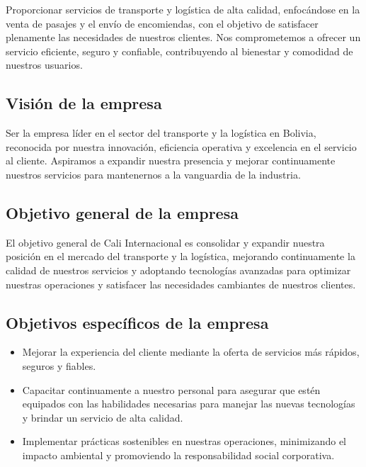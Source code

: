 	Proporcionar servicios de transporte y logística de alta calidad, enfocándose en la venta de pasajes y el envío de encomiendas, con el objetivo de satisfacer plenamente las necesidades de nuestros clientes. Nos comprometemos a ofrecer un servicio eficiente, seguro y confiable, contribuyendo al bienestar y comodidad de nuestros usuarios.
	
	\subsection*{Visión de la empresa}
	
	Ser la empresa líder en el sector del transporte y la logística en Bolivia, reconocida por nuestra innovación, eficiencia operativa y excelencia en el servicio al cliente. Aspiramos a expandir nuestra presencia y mejorar continuamente nuestros servicios para mantenernos a la vanguardia de la industria.
	
	\subsection*{Objetivo general de la empresa}
	El objetivo general de Cali Internacional es consolidar y expandir nuestra posición en el mercado del transporte y la logística, mejorando continuamente la calidad de nuestros servicios y adoptando tecnologías avanzadas para optimizar nuestras operaciones y satisfacer las necesidades cambiantes de nuestros clientes.
	
	\subsection*{Objetivos específicos de la empresa}
	
	\begin{itemize}[label=$\bullet$, left=0cm, labelsep = 1.05cm, topsep = 0pt, parsep = 0pt]
		
		\item Mejorar la experiencia del cliente mediante la oferta de servicios más rápidos, seguros y fiables.
		
		\item Capacitar continuamente a nuestro personal para asegurar que estén equipados con las habilidades necesarias para manejar las nuevas tecnologías y brindar un servicio de alta calidad.
		
		\item Implementar prácticas sostenibles en nuestras operaciones, minimizando el impacto ambiental y promoviendo la responsabilidad social corporativa.
		
	\end{itemize}	
	
